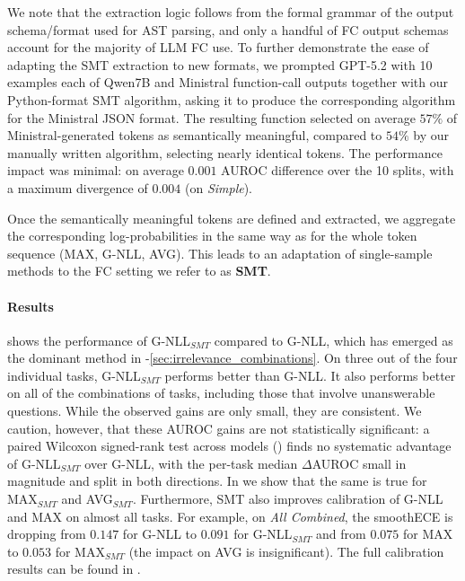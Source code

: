 We note that the extraction logic follows from the formal grammar of the output schema/format used for AST parsing, and only a handful of FC output schemas account for the majority of LLM FC use. To further demonstrate the ease of adapting the SMT extraction to new formats, we prompted GPT-5.2 with 10 examples each of Qwen7B and Ministral function-call outputs together with our Python-format SMT algorithm, asking it to produce the corresponding algorithm for the Ministral JSON format. The resulting function selected on average $57\%$ of Ministral-generated tokens as semantically meaningful, compared to $54\%$ by our manually written algorithm, selecting nearly identical tokens. The performance impact was minimal: on average $0.001$ AUROC difference over the 10 splits, with a maximum divergence of $0.004$ (on \emph{Simple}).


Once the semantically meaningful tokens are defined and extracted, we aggregate the corresponding log-probabilities in the same way as for the whole token sequence (MAX, G-NLL, AVG). This leads to an adaptation of single-sample methods to the FC setting we refer to as \textbf{SMT}.




\setlength{\tabcolsep}{10pt}


\vspace{-5pt}
\paragraph{Results}



 shows the performance of G-NLL$_{SMT}$ compared to G-NLL, which has emerged as the dominant method in -\ref{sec:irrelevance_combinations}.
On three out of the four individual tasks, G-NLL$_{SMT}$ performs better than G-NLL. 
It also performs better on all of the combinations of tasks, including those that involve unanswerable questions. While the observed gains are only small, they are consistent.
We caution, however, that these AUROC gains are not statistically significant: a paired Wilcoxon signed-rank test across models () finds no systematic advantage of G-NLL$_{SMT}$ over G-NLL, with the per-task median $\Delta$AUROC small in magnitude and split in both directions.
In  we show that the same is true for MAX$_{SMT}$ and AVG$_{SMT}$.
Furthermore, SMT also improves calibration of G-NLL and MAX on almost all tasks. For example, on \textit{All Combined}, the smoothECE is dropping from $0.147$ for G-NLL to $0.091$ for G-NLL$_{SMT}$ and from $0.075$ for MAX to $0.053$ for MAX$_{SMT}$ (the impact on AVG is insignificant). The full calibration results can be found in .

